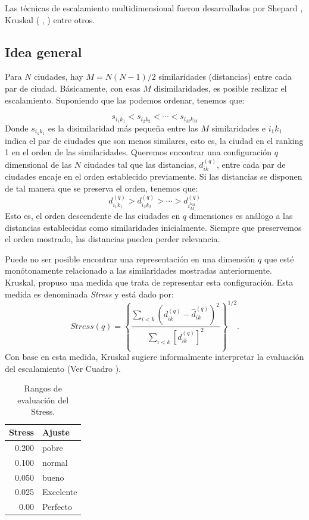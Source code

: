 \documentclass[11pt,letterpaper]{article}
\begin{document}
Las técnicas de escalamiento multidimensional fueron desarrollados por Shepard \cite{Shepard-1980},
Kruskal ( \cite{kruskal-1964}, \cite{kruskal2-1964})
entre otros.
\subsection{Idea general}
Para $N$ ciudades, hay $M=N(N-1)/2$ similaridades (distancias) entre cada par de ciudad. Básicamente, con esas $M$ disimilaridades, es posible realizar el escalamiento. Suponiendo que las podemos ordenar, tenemos que:

$$
s_{i_{1} k_{1}}<s_{i_{2} k_{2}}<\cdots<s_{i_{M} k_{M}}
$$
Donde $s_{i_{1} k_{1}}$ es la disimilaridad más pequeña entre las $M$ similaridades e $i_{1} k_{1}$ indica el par de ciudades que  son menos similares, esto es, la ciudad en el ranking 1 en el orden de las similaridades. Queremos encontrar una  configuración $q$ dimensional de las $N$ ciudades tal que las distancias, $d_{i k}^{(q)}$, entre cada par de ciudades encaje en el orden establecido previamente. Si las distancias se disponen de tal manera que se preserva el orden, tenemos que:
$$
d_{i_{1} k_{1}}^{(q)}>d_{i_{2} k_{2}}^{(q)}>\cdots>d_{i_{M}^{k_{M}}}^{(q)}
$$
Esto es, el orden descendente de las ciudades en $q$ dimensiones es análogo a las distancias establecidas como similaridades inicialmente. Siempre que preservemos el orden mostrado, las distancias pueden perder relevancia.

Puede no ser posible encontrar una representación en una dimensión $q$ que esté monótonamente relacionado a las similaridades mostradas anteriormente. Kruskal, propuso una medida que trata de representar esta configuración. Esta medida es denominada \textit{Stress} y está dado por:
$$
Stress(q)=\left\{\frac{\sum_{i<k}\left(d_{i k}^{(q)}-\hat{d}_{i k}^{(q)}\right)^{2}}{\sum_{i<k}\left[d_{i k}^{(q)}\right]^{2}}\right\}^{1/2}.
$$
Con base en esta medida, Kruskal sugiere informalmente interpretar la evaluación del escalamiento (Ver Cuadro ).

\begin{table}
\begin{center}
\begin{tabular}{r l} \hline \hline
Stress & Ajuste \\
\hline \hline
0.200 & pobre \\
0.100 & normal \\
0.050 & bueno\\
0.025 & Excelente\\
0.00 & Perfecto\\ \hline \hline 
\end{tabular}
\caption{Rangos de evaluación del Stress.}\label{stre}
\end{center}
\end{table}
\end{document}
